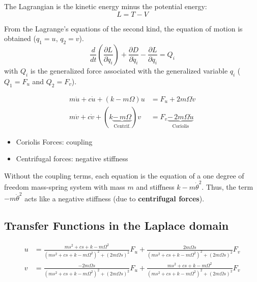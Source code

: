 \documentclass{ISMA_USD2020}
\begin{document}
The Lagrangian is the kinetic energy minus the potential energy:
\begin{equation}
L = T - V
\end{equation}

From the Lagrange's equations of the second kind, the equation of motion is obtained (\(q_1 = u\), \(q_2 = v\)).
\begin{equation}
  \frac{d}{dt} \left( \frac{\partial L}{\partial \dot{q}_i} \right) + \frac{\partial D}{\partial \dot{q}_i} - \frac{\partial L}{\partial q_i} = Q_i
\end{equation}
with \(Q_i\) is the generalized force associated with the generalized variable \(q_i\) (\(Q_1 = F_u\) and \(Q_2 = F_v\)).


\begin{subequations}
  \begin{align}
    m \ddot{u} + c \dot{u} + ( k - m \Omega ) u &= F_u + 2 m \Omega \dot{v} \\
    m \ddot{v} + c \dot{v} + ( k \underbrace{-\,m \Omega}_{\text{Centrif.}} ) v &= F_v \underbrace{-\,2 m \Omega \dot{u}}_{\text{Coriolis}}
  \end{align}
\end{subequations}

\begin{itemize}
\item Coriolis Forces: coupling
\item Centrifugal forces: negative stiffness
\end{itemize}

Without the coupling terms, each equation is the equation of a one degree of freedom mass-spring system with mass \(m\) and stiffness \(k- m\dot{\theta}^2\).
Thus, the term \(- m\dot{\theta}^2\) acts like a negative stiffness (due to \textbf{centrifugal forces}).


\subsection{Transfer Functions in the Laplace domain}
\label{sec:orgb1002ed}

\begin{subequations}
  \begin{align}
    u &= \frac{ms^2 + cs + k - m \Omega^2}{\left( m s^2 + cs + k - m \Omega^2 \right)^2 + \left( 2 m \Omega s \right)^2} F_u +  \frac{2 m \Omega s}{\left( m s^2 + cs + k - m \Omega^2 \right)^2 + \left( 2 m \Omega s \right)^2} F_v \\
    v &= \frac{-2 m \Omega s}{\left( m s^2 + cs + k - m \Omega^2 \right)^2 + \left( 2 m \Omega s \right)^2} F_u +  \frac{ms^2 + cs + k - m \Omega^2}{\left( m s^2 + cs + k - m \Omega^2 \right)^2 + \left( 2 m \Omega s \right)^2} F_v
  \end{align}
\end{subequations}
\end{document}
